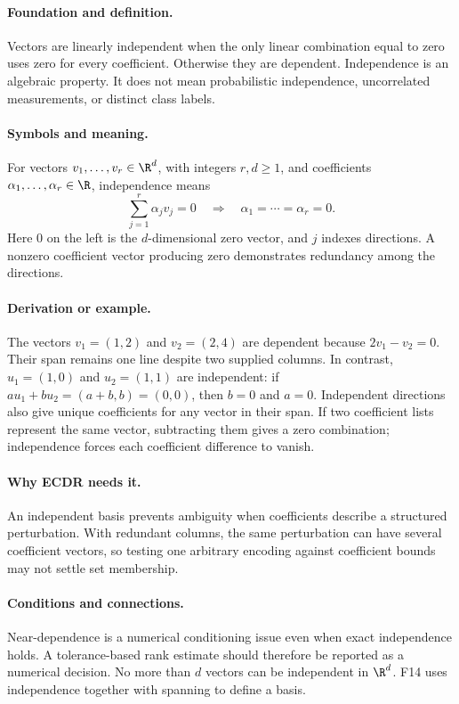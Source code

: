 \paragraph{Foundation and definition.}
Vectors are linearly independent when the only linear combination equal
to zero uses zero for every coefficient. Otherwise they are dependent.
Independence is an algebraic property. It does not mean probabilistic
independence, uncorrelated measurements, or distinct class labels.
\paragraph{Symbols and meaning.}
For vectors $v_1,\ldots,v_r\in\R^d$, with integers $r,d\ge1$, and
coefficients $\alpha_1,\ldots,\alpha_r\in\R$, independence means
\[
 \sum_{j=1}^{r}\alpha_jv_j=0
 \quad\Rightarrow\quad
 \alpha_1=\cdots=\alpha_r=0.
\]
Here $0$ on the left is the $d$-dimensional zero vector, and $j$ indexes
directions. A nonzero coefficient vector producing zero demonstrates
redundancy among the directions.
\paragraph{Derivation or example.}
The vectors $v_1=(1,2)$ and $v_2=(2,4)$ are dependent because
$2v_1-v_2=0$. Their span remains one line despite two supplied columns.
In contrast, $u_1=(1,0)$ and $u_2=(1,1)$ are independent: if
$a u_1+b u_2=(a+b,b)=(0,0)$, then $b=0$ and $a=0$.
Independent directions also give unique coefficients for any vector in
their span. If two coefficient lists represent the same vector,
subtracting them gives a zero combination; independence forces each
coefficient difference to vanish.
\paragraph{Why ECDR needs it.}
An independent basis prevents ambiguity when coefficients describe a
structured perturbation. With redundant columns, the same perturbation
can have several coefficient vectors, so testing one arbitrary encoding
against coefficient bounds may not settle set membership.
\paragraph{Conditions and connections.}
Near-dependence is a numerical conditioning issue even when exact
independence holds. A tolerance-based rank estimate should therefore be
reported as a numerical decision. No more than $d$ vectors can be
independent in $\R^d$. F14 uses independence together with spanning to
define a basis.

